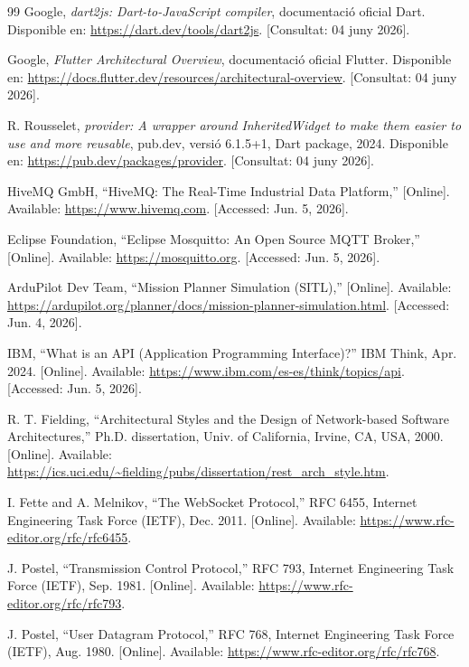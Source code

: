\documentclass[spanish,final]{setup/eetac_tfc_pfc}
\begin{document}
\begin{thebibliography}{99}
Google,
\textit{dart2js: Dart-to-JavaScript compiler},
documentació oficial Dart.
Disponible en: \url{https://dart.dev/tools/dart2js}.
[Consultat: 04 juny 2026].

Google,
\textit{Flutter Architectural Overview},
documentació oficial Flutter.
Disponible en: \url{https://docs.flutter.dev/resources/architectural-overview}.
[Consultat: 04 juny 2026].

R. Rousselet,
\textit{provider: A wrapper around InheritedWidget to make them
easier to use and more reusable},
pub.dev, versió 6.1.5+1, Dart package, 2024.
Disponible en: \url{https://pub.dev/packages/provider}.
[Consultat: 04 juny 2026].

HiveMQ GmbH, ``HiveMQ: The Real-Time Industrial Data Platform,''
[Online]. Available: \url{https://www.hivemq.com}.
[Accessed: Jun. 5, 2026].

Eclipse Foundation, ``Eclipse Mosquitto: An Open Source MQTT Broker,''
[Online]. Available: \url{https://mosquitto.org}.
[Accessed: Jun. 5, 2026].

ArduPilot Dev Team, ``Mission Planner Simulation (SITL),''
[Online]. Available: \url{https://ardupilot.org/planner/docs/mission-planner-simulation.html}.
[Accessed: Jun. 4, 2026].

IBM, ``What is an API (Application Programming Interface)?''
IBM Think, Apr. 2024. [Online].
Available: \url{https://www.ibm.com/es-es/think/topics/api}.
[Accessed: Jun. 5, 2026].

R. T. Fielding, ``Architectural Styles and the Design of Network-based
Software Architectures,'' Ph.D. dissertation, Univ. of California,
Irvine, CA, USA, 2000. [Online].
Available: \url{https://ics.uci.edu/~fielding/pubs/dissertation/rest_arch_style.htm}.

I. Fette and A. Melnikov, ``The WebSocket Protocol,''
RFC 6455, Internet Engineering Task Force (IETF), Dec. 2011.
[Online]. Available: \url{https://www.rfc-editor.org/rfc/rfc6455}.

J. Postel, ``Transmission Control Protocol,''
RFC 793, Internet Engineering Task Force (IETF), Sep. 1981. [Online].
Available: \url{https://www.rfc-editor.org/rfc/rfc793}.

J. Postel, ``User Datagram Protocol,''
RFC 768, Internet Engineering Task Force (IETF), Aug. 1980. [Online].
Available: \url{https://www.rfc-editor.org/rfc/rfc768}.


\end{thebibliography}
\end{document}
